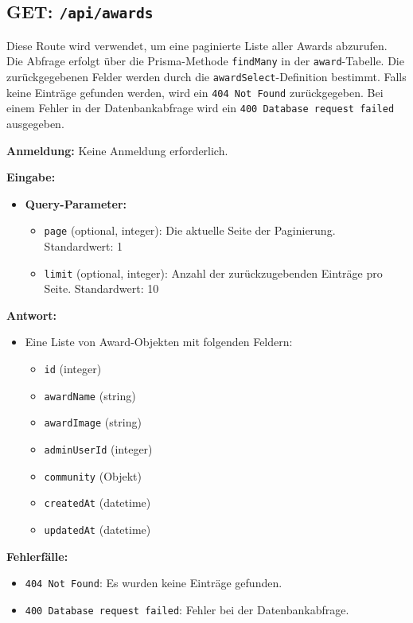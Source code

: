 \documentclass[a4paper,12pt]{article}
\begin{document}
\subsection{GET: \texttt{/api/awards}}

Diese Route wird verwendet, um eine paginierte Liste aller Awards abzurufen.
Die Abfrage erfolgt über die Prisma-Methode \texttt{findMany} in der
\texttt{award}-Tabelle. Die zurückgegebenen Felder werden durch die
\texttt{awardSelect}-Definition bestimmt. Falls keine Einträge gefunden werden,
wird ein \texttt{404 Not Found} zurückgegeben. Bei einem Fehler in der
Datenbankabfrage wird ein \texttt{400 Database request failed} ausgegeben.

\textbf{Anmeldung:} Keine Anmeldung erforderlich.

\textbf{Eingabe:}
\begin{itemize}
    \item \textbf{Query-Parameter:}
    \begin{itemize}
        \item \texttt{page} (optional, integer):
            Die aktuelle Seite der Paginierung. Standardwert: 1
        \item \texttt{limit} (optional, integer):
            Anzahl der zurückzugebenden Einträge pro Seite. Standardwert: 10
    \end{itemize}
\end{itemize}

\textbf{Antwort:}
\begin{itemize}
    \item Eine Liste von Award-Objekten mit folgenden Feldern:
    \begin{itemize}
        \item \texttt{id} (integer)
        \item \texttt{awardName} (string)
        \item \texttt{awardImage} (string)
        \item \texttt{adminUserId} (integer)
        \item \texttt{community} (Objekt)
        \item \texttt{createdAt} (datetime)
        \item \texttt{updatedAt} (datetime)
    \end{itemize}
\end{itemize}

\textbf{Fehlerfälle:}
\begin{itemize}
    \item \texttt{404 Not Found}:
        Es wurden keine Einträge gefunden.
    \item \texttt{400 Database request failed}:
        Fehler bei der Datenbankabfrage.
\end{itemize}
\end{document}
